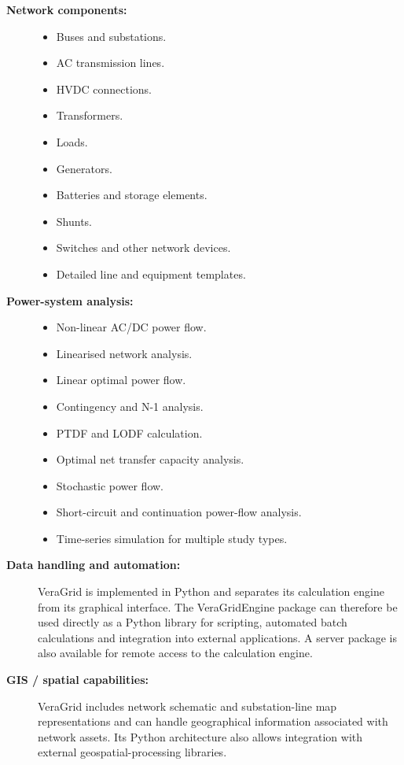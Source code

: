 \begin{description}
    \item[\textbf{Network components:}] \hfill
    \begin{itemize}
        \item Buses and substations.
        \item AC transmission lines.
        \item HVDC connections.
        \item Transformers.
        \item Loads.
        \item Generators.
        \item Batteries and storage elements.
        \item Shunts.
        \item Switches and other network devices.
        \item Detailed line and equipment templates.
    \end{itemize}

    \item[\textbf{Power-system analysis:}] \hfill
    \begin{itemize}
        \item Non-linear AC/DC power flow.
        \item Linearised network analysis.
        \item Linear optimal power flow.
        \item Contingency and N-1 analysis.
        \item PTDF and LODF calculation.
        \item Optimal net transfer capacity analysis.
        \item Stochastic power flow.
        \item Short-circuit and continuation power-flow analysis.
        \item Time-series simulation for multiple study types.
    \end{itemize}

    \item[\textbf{Data handling and automation:}]
    VeraGrid is implemented in Python and separates its calculation engine
    from its graphical interface. The VeraGridEngine package can therefore
    be used directly as a Python library for scripting, automated batch
    calculations and integration into external applications. A server
    package is also available for remote access to the calculation engine.

    \item[\textbf{GIS / spatial capabilities:}]
    VeraGrid includes network schematic and substation-line map
    representations and can handle geographical information associated with
    network assets. Its Python architecture also allows integration with
    external geospatial-processing libraries.


\end{description}
